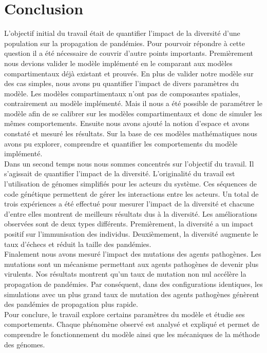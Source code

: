 \chapter{Conclusion} \label{ch:conclusion}

L'objectif initial du travail était de quantifier l'impact de la diversité d'une population sur la propagation de pandémies. Pour pourvoir répondre à cette question il a été nécessaire de couvrir d'autre points importants. Premièrement nous devions valider le modèle implémenté en le comparant aux modèles compartimentaux déjà existant et prouvés. En plus de valider notre modèle sur des cas simples, nous avons pu quantifier l'impact de divers paramètres du modèle. Les modèles compartimentaux n'ont pas de composantes spatiales, contrairement au modèle implémenté. Mais il nous a été possible de paramétrer le modèle afin de se calibrer sur les modèles compartimentaux et donc de simuler les mêmes comportements. Ensuite nous avons ajouté la notion d'espace et avons constaté et mesuré les résultats. Sur la base de ces modèles mathématiques nous avons pu explorer, comprendre et quantifier les comportements du modèle implémenté.\\

Dans un second temps nous nous sommes concentrés sur l'objectif du travail. Il s'agissait de quantifier l'impact de la diversité. L'originalité du travail est l'utilisation de génomes simplifiés pour les acteurs du système. Ces séquences de code génétique permettent de gérer les interactions entre les acteurs. Un total de trois expériences a été effectué pour mesurer l'impact de la diversité et chacune d'entre elles montrent de meilleurs résultats dus à la diversité. Les améliorations observées sont de deux types différents. Premièrement, la diversité a un impact positif sur l'immunisation des individus. Deuxièmement, la diversité augmente le taux d'échecs et réduit la taille des pandémies.\\

Finalement nous avons mesuré l'impact des mutations des agents pathogènes. Les mutations sont un mécanisme permettant aux agents pathogènes de devenir plus virulents. Nos résultats montrent qu'un taux de mutation non nul accélère la propagation de pandémies. Par conséquent, dans des configurations identiques, les simulations avec un plus grand taux de mutation des agents pathogènes génèrent des pandémies de propagation plus rapide.\\

Pour conclure, le travail explore certains paramètres du modèle et étudie ses comportements. Chaque phénomène observé est analysé et expliqué et permet de comprendre le fonctionnement du modèle ainsi que les mécaniques de la méthode des génomes.